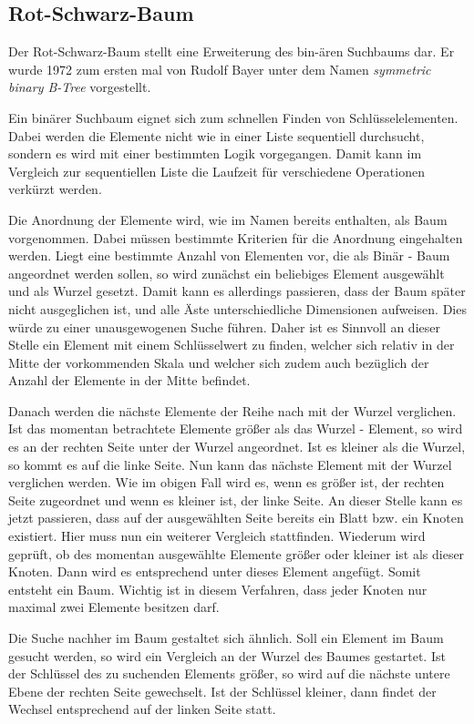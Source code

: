 \subsection{Rot-Schwarz-Baum}\label{s:rb_tree}
Der Rot-Schwarz-Baum stellt eine Erweiterung des bin-ären Suchbaums dar. Er wurde 1972 zum ersten mal von Rudolf Bayer unter dem Namen  \textit{symmetric binary B-Tree} vorgestellt.

Ein binärer Suchbaum eignet sich zum schnellen Finden von Schlüsselelementen. Dabei werden die Elemente nicht wie in einer Liste sequentiell durchsucht, sondern es wird mit einer bestimmten Logik vorgegangen.
Damit kann im Vergleich zur sequentiellen Liste die Laufzeit für verschiedene Operationen verkürzt werden.

Die Anordnung der Elemente wird, wie im Namen bereits enthalten, als Baum vorgenommen. Dabei müssen bestimmte Kriterien für die Anordnung eingehalten werden. Liegt eine bestimmte Anzahl von Elementen vor, die als Binär - Baum angeordnet werden sollen, so wird zunächst ein beliebiges Element ausgewählt und als Wurzel gesetzt. Damit kann es allerdings passieren, dass der Baum später nicht ausgeglichen ist, und alle Äste unterschiedliche Dimensionen aufweisen. Dies würde zu einer unausgewogenen Suche führen. Daher ist es Sinnvoll an dieser Stelle ein Element mit einem Schlüsselwert zu finden, welcher sich relativ in der Mitte der vorkommenden Skala und welcher sich zudem auch bezüglich der Anzahl der Elemente in der Mitte befindet.

Danach werden die nächste Elemente der Reihe nach mit der Wurzel verglichen. Ist das momentan betrachtete Elemente größer als das Wurzel - Element, so wird es an der rechten Seite unter der Wurzel angeordnet. Ist es kleiner als die Wurzel, so kommt es auf die linke Seite. Nun kann das nächste Element mit der Wurzel verglichen werden. Wie im obigen Fall wird es, wenn es größer ist, der rechten Seite zugeordnet und wenn es kleiner ist, der linke Seite. An dieser Stelle kann es jetzt passieren, dass auf der ausgewählten Seite bereits ein Blatt bzw. ein Knoten existiert. Hier muss nun ein weiterer Vergleich stattfinden. Wiederum wird geprüft, ob des momentan ausgewählte Elemente größer oder kleiner ist als dieser Knoten. Dann wird es entsprechend unter dieses Element angefügt. Somit entsteht ein Baum. Wichtig ist in diesem Verfahren, dass jeder Knoten nur maximal zwei Elemente besitzen darf. 

Die Suche nachher im Baum gestaltet sich ähnlich. Soll ein Element im Baum gesucht werden, so wird ein Vergleich an der Wurzel des Baumes gestartet. Ist der Schlüs\-sel des zu suchenden Elements größer, so wird auf die nächste untere Ebene der rechten Seite gewechselt. Ist der Schlüssel kleiner, dann findet der Wechsel entsprechend auf der linken Seite statt. 

